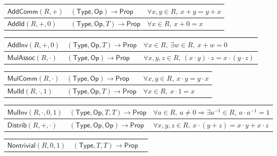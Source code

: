 \documentclass[11pt,reqno]{amsart}
\theoremstyle{blueplain}
\numberwithin{equation}{section}
\begin{document}
{\begin{tabular}{|m{5cm}|m{5cm}|m{8.3cm}|}
	\end{tabular}%
	\noindent \newline
	\noindent
	\begin{tabular}{|m{5cm}|m{5cm}|m{8.3cm}|}
		\hline
		$\mathsf{AddComm}(R,+)$ & $(\mathsf{Type},\mathsf{Op})\to\mathsf{Prop}$ &
		$\forall x,y\in R,\ x+y=y+x$ \\ \hline
		$\mathsf{AddId}(R,+,0)$ & $(\mathsf{Type},\mathsf{Op},T)\to\mathsf{Prop}$ &
		$\forall x\in R,\ x+0=x$ \\ 
	\end{tabular}
	\noindent \newline
	\noindent
	\begin{tabular}{|m{5cm}|m{5cm}|m{8.3cm}|}
		\hline
		$\mathsf{AddInv}(R,+,0)$ & $(\mathsf{Type},\mathsf{Op},T)\to\mathsf{Prop}$ &
		$\forall x\in R,\ \exists w\in R,\ x+w=0$ \\ \hline
		$\mathsf{MulAssoc}(R,\cdot)$ & $(\mathsf{Type},\mathsf{Op})\to\mathsf{Prop}$ &
		$\forall x,y,z\in R,\ (x\cdot y)\cdot z=x\cdot(y\cdot z)$ \\ 
	\end{tabular}
	\noindent \newline
	\noindent
	\begin{tabular}{|m{5cm}|m{5cm}|m{8.3cm}|}
		\hline
		$\mathsf{MulComm}(R,\cdot)$ & $(\mathsf{Type},\mathsf{Op})\to\mathsf{Prop}$ &
		$\forall x,y\in R,\ x\cdot y=y\cdot x$ \\ \hline
		$\mathsf{MulId}(R,\cdot,1)$ & $(\mathsf{Type},\mathsf{Op},T)\to\mathsf{Prop}$ &
		$\forall x\in R,\ x\cdot 1=x$ \\ 
	\end{tabular}
	\noindent \newline
	\noindent
	\begin{tabular}{|m{5cm}|m{5cm}|m{8.3cm}|}
		\hline
		$\mathsf{MulInv}(R,\cdot,0,1)$ & $(\mathsf{Type},\mathsf{Op},T,T)\to\mathsf{Prop}$ &
		$\forall a\in R,\ a\neq 0\Rightarrow\exists a^{-1}\in R,\ a\cdot a^{-1}=1$ \\ \hline
		$\mathsf{Distrib}(R,+,\cdot)$ & $(\mathsf{Type},\mathsf{Op},\mathsf{Op})\to\mathsf{Prop}$ &
		$\forall x,y,z\in R,\ x\cdot(y+z)=x\cdot y+x\cdot z$ \\ 
	\end{tabular}
	\noindent \newline
	\noindent
	\begin{tabular}{|m{5cm}|m{5cm}|m{8.3cm}|}
		\hline
		$\mathsf{Nontrivial}(R,0,1)$ & $(\mathsf{Type},T,T)\to\mathsf{Prop}$ &

\end{tabular}}
\end{document}
